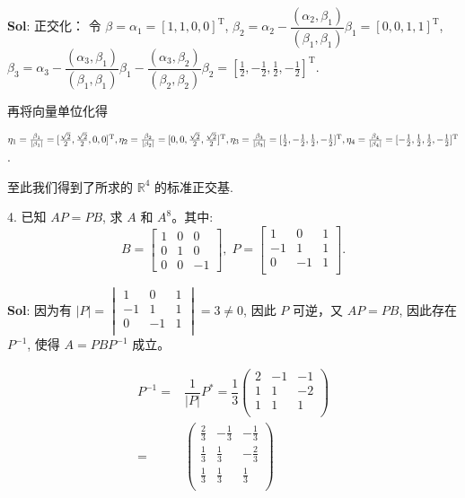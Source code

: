 \textbf{Sol}:  正交化：  
令 $\beta=\alpha_1=[1,1,0,0]^\text{T}$, $\beta_2=\alpha_2-\dfrac{(\alpha_2,\beta_1)}{(\beta_1,\beta_1)}\beta_1=[0,0,1,1]^{\text{T}}$, $\beta_3=\alpha_3-\dfrac{(\alpha_3,\beta_1)}{(\beta_1,\beta_1)}\beta_1-\dfrac{(\alpha_3,\beta_2)}{(\beta_2,\beta_2)}\beta_2=[\frac{1}{2},-\frac{1}{2},\frac{1}{2},-\frac{1}{2}]^\text{T}$.\par


再将向量单位化得 \par
$\eta_1=\frac{\beta_1}{|\beta_1|}=[\frac{\sqrt{2}}{2},\frac{\sqrt{2}}{2},0,0]^\text{T},\;\\\\
\eta_2=\frac{\beta_2}{|\beta_2|}=[0,0,\frac{\sqrt{2}}{2},\frac{\sqrt{2}}{2}]^\text{T},\;\\\\
\eta_3=\frac{\beta_3}{|\beta_3|}=[\frac{1}{2},-\frac{1}{2},\frac{1}{2},-\frac{1}{2}]^\text{T},\;\\\\
\eta_4=\frac{\beta_4}{|\beta_4|}=[-\frac{1}{2},\frac{1}{2},\frac{1}{2},-\frac{1}{2}]^\text{T}$.\par

至此我们得到了所求的 $\mathbb{R}^4$ 的标准正交基.

4. 已知 $AP=PB$, 求 $A$ 和 $A^8$。其中:
$$
B=\begin{bmatrix}
1&0&0\\
0&1&0\\
0&0&-1
\end{bmatrix},\;
P=\begin{bmatrix}
    1&0&1\\
    -1&1&1\\
    0&-1&1\\
\end{bmatrix}.
$$

\textbf{Sol}: 因为有 $|P|=\begin{vmatrix}
    1&0&1\\
    -1&1&1\\
    0&-1&1\\
\end{vmatrix}=3\not=0$, 因此 $P$ 可逆，又 $AP=PB$, 因此存在 $P^{-1}$, 使得 $A=PBP^{-1}$ 成立。

$$
\begin{aligned}
P^{-1}=&\dfrac{1}{|P|}P^{*}=\dfrac{1}{3}
\begin{pmatrix}
2&-1&-1\\
1&1&-2\\
1&1&1\\
\end{pmatrix}\\
=&\begin{pmatrix}
\frac{2}{3}&-\frac{1}{3}&-\frac{1}{3}\\
\frac{1}{3}&\frac{1}{3}&-\frac{2}{3}\\
\frac{1}{3}&\frac{1}{3}&\frac{1}{3}\\
\end{pmatrix}
\end{aligned}
$$

